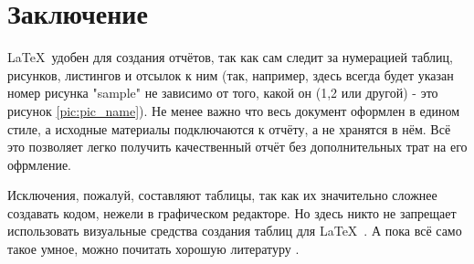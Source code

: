 \section*{Заключение}
\LaTeX\ удобен для создания отчётов, так как сам следит за нумерацией таблиц, рисунков, листингов и отсылок к ним (так, например, здесь всегда будет указан номер рисунка "sample" не зависимо от того, какой он (1,2 или другой) - это рисунок \ref{pic:pic_name}). Не менее важно что весь документ оформлен в едином стиле, а исходные материалы подключаются к отчёту, а не хранятся в нём. Всё это позволяет легко получить качественный отчёт без дополнительных трат на его офрмление.

Исключения, пожалуй, составляют таблицы, так как их значительно сложнее создавать кодом, нежели в графическом редакторе. Но здесь никто не запрещает использовать визуальные средства создания таблиц для \LaTeX\ . А пока всё само такое умное, можно почитать хорошую литературу \cite{saturday_is_monday}.


\renewcommand\refname{Список использованных источников}


